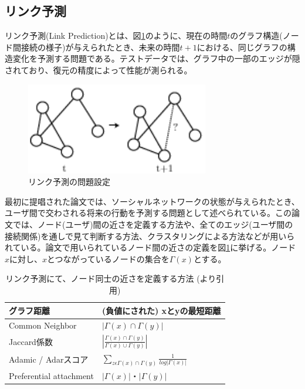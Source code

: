 \subsection{リンク予測}
リンク予測(Link Prediction)とは、図\ref{c2_link_prediction}のように、現在の時間$t$のグラフ構造(ノード間接続の様子)が与えられたとき、未来の時間$t+1$における、同じグラフの構造変化を予測する問題である。テストデータでは、グラフ中の一部のエッジが隠されており、復元の精度によって性能が測られる。\par
\begin{figure}[tbp]
 \centering
  \includegraphics[width=80mm]{img/c2/link_prediction}
 \caption{リンク予測の問題設定}
 \label{c2_link_prediction}
\end{figure}
最初に提唱された論文\cite{liben-nowell2007the-link-prediction}では、ソーシャルネットワークの状態が与えられたとき、ユーザ間で交わされる将来の行動を予測する問題として述べられている。この論文では、ノード(ユーザ)間の近さを定義する方法や、全てのエッジ(ユーザ間の接続関係)を通しで見て判断する方法、クラスタリングによる方法などが用いられている。論文で用いられているノード間の近さの定義を図\ref{c2_lp_method}に挙げる。ノード$x$に対し、$x$とつながっているノードの集合を$\Gamma(x)$とする。\par
\begin{table}[tbp]
 \begin{center}
  \caption{リンク予測にて、ノード同士の近さを定義する方法 (\cite{liben-nowell2007the-link-prediction}より引用)}
  \begin{tabular}{|l|l|}\hline
  グラフ距離 & (負値にされた) xとyの最短距離 \\ \hline
  Common Neighbor & $|\Gamma(x)∩\Gamma(y)|$ \\ \hline
  Jaccard係数 \cite{jaccard1902lois}& $\left| \frac{\Gamma(x)∩\Gamma(y)}{\Gamma(x)∪\Gamma(y)} \right|$ \\ \hline
  Adamic / Adarスコア \cite{adamic2003friends}& $\sum_{z\epsilon \Gamma(x)∩\Gamma(y)} \frac{1}{log|\Gamma(x)|}$ \\ \hline
  Preferential attachment & $|\Gamma(x)|・|\Gamma(y)|$ \\ \hline
  \end{tabular}
 \end{center}
 \label{c2_lp_method}
\end{table}

